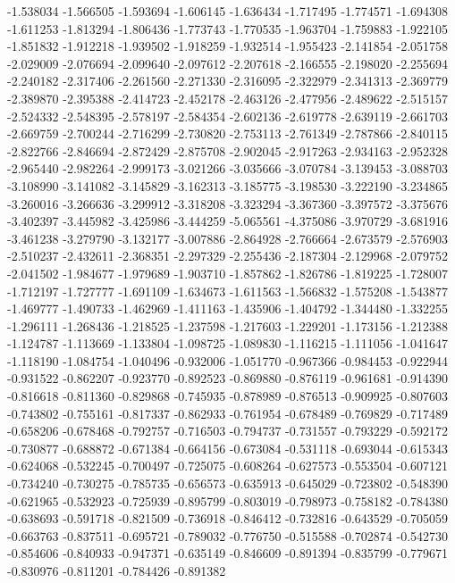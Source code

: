 -1.538034
-1.566505
-1.593694
-1.606145
-1.636434
-1.717495
-1.774571
-1.694308
-1.611253
-1.813294
-1.806436
-1.773743
-1.770535
-1.963704
-1.759883
-1.922105
-1.851832
-1.912218
-1.939502
-1.918259
-1.932514
-1.955423
-2.141854
-2.051758
-2.029009
-2.076694
-2.099640
-2.097612
-2.207618
-2.166555
-2.198020
-2.255694
-2.240182
-2.317406
-2.261560
-2.271330
-2.316095
-2.322979
-2.341313
-2.369779
-2.389870
-2.395388
-2.414723
-2.452178
-2.463126
-2.477956
-2.489622
-2.515157
-2.524332
-2.548395
-2.578197
-2.584354
-2.602136
-2.619778
-2.639119
-2.661703
-2.669759
-2.700244
-2.716299
-2.730820
-2.753113
-2.761349
-2.787866
-2.840115
-2.822766
-2.846694
-2.872429
-2.875708
-2.902045
-2.917263
-2.934163
-2.952328
-2.965440
-2.982264
-2.999173
-3.021266
-3.035666
-3.070784
-3.139453
-3.088703
-3.108990
-3.141082
-3.145829
-3.162313
-3.185775
-3.198530
-3.222190
-3.234865
-3.260016
-3.266636
-3.299912
-3.318208
-3.323294
-3.367360
-3.397572
-3.375676
-3.402397
-3.445982
-3.425986
-3.444259
-5.065561
-4.375086
-3.970729
-3.681916
-3.461238
-3.279790
-3.132177
-3.007886
-2.864928
-2.766664
-2.673579
-2.576903
-2.510237
-2.432611
-2.368351
-2.297329
-2.255436
-2.187304
-2.129968
-2.079752
-2.041502
-1.984677
-1.979689
-1.903710
-1.857862
-1.826786
-1.819225
-1.728007
-1.712197
-1.727777
-1.691109
-1.634673
-1.611563
-1.566832
-1.575208
-1.543877
-1.469777
-1.490733
-1.462969
-1.411163
-1.435906
-1.404792
-1.344480
-1.332255
-1.296111
-1.268436
-1.218525
-1.237598
-1.217603
-1.229201
-1.173156
-1.212388
-1.124787
-1.113669
-1.133804
-1.098725
-1.089830
-1.116215
-1.111056
-1.041647
-1.118190
-1.084754
-1.040496
-0.932006
-1.051770
-0.967366
-0.984453
-0.922944
-0.931522
-0.862207
-0.923770
-0.892523
-0.869880
-0.876119
-0.961681
-0.914390
-0.816618
-0.811360
-0.829868
-0.745935
-0.878989
-0.876513
-0.909925
-0.807603
-0.743802
-0.755161
-0.817337
-0.862933
-0.761954
-0.678489
-0.769829
-0.717489
-0.658206
-0.678468
-0.792757
-0.716503
-0.794737
-0.731557
-0.793229
-0.592172
-0.730877
-0.688872
-0.671384
-0.664156
-0.673084
-0.531118
-0.693044
-0.615343
-0.624068
-0.532245
-0.700497
-0.725075
-0.608264
-0.627573
-0.553504
-0.607121
-0.734240
-0.730275
-0.785735
-0.656573
-0.635913
-0.645029
-0.723802
-0.548390
-0.621965
-0.532923
-0.725939
-0.895799
-0.803019
-0.798973
-0.758182
-0.784380
-0.638693
-0.591718
-0.821509
-0.736918
-0.846412
-0.732816
-0.643529
-0.705059
-0.663763
-0.837511
-0.695721
-0.789032
-0.776750
-0.515588
-0.702874
-0.542730
-0.854606
-0.840933
-0.947371
-0.635149
-0.846609
-0.891394
-0.835799
-0.779671
-0.830976
-0.811201
-0.784426
-0.891382
